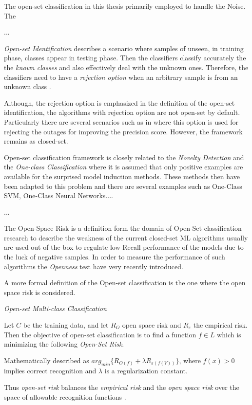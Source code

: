 The open-set classification in this thesis primarily employed to handle the Noise. The

...


\begin{definition}{\textit{Open-set Identification}}
describes a scenario where samples of unseen, in training phase, classes appear in testing phase. Then the classifiers classify accurately the the \textit{known classes} and also effectively deal with the unknown ones. Therefore, the classifiers need to have a \textit{rejection option} when an arbitrary sample is from an unknown class \parencite{geng2018recent}.
\end{definition}

Although, the rejection option is emphasized in the definition of the open-set identification, the algorithms with rejection option are not open-set by default. Particularly there are several scenarios such as in \parencite{onan2018ensemble} where this option is used for rejecting the outages for improving the precision score. However, the framework remains as closed-set.

Open-set classification framework is closely related to the \textit{Novelty Detection} and the \textit{One-class Classification} where it is assumed that only positive examples are available for the surprised model induction methods. These methods then have been adapted to this problem and there are several examples such as One-Class SVM, One-Class Neural Networks....


...


The {Open-Space Risk} is a definition form the domain of Open-Set classification research to describe the weakness of the current closed-set ML algorithms usually are used out-of-the-box to regulate low Recall performance of the models due to the luck of negative samples. In order to measure the performance of such algorithms the \textit{Openness} test have very recently introduced. 

A more formal definition of the Open-set classification is the one where the open space risk is considered.

\begin{definition}{\textit{Open-set Multi-class Classification}}

Let $C$ be the training data, and let $R_{O}$ open space risk and $R_{ε}$ the empirical risk. Then the objective of open-set classification is to find a function $f \in L$ which is minimizing the following \textit{Open-Set Risk}. 

Mathematically described as $arg_{min} \{R_{O(f )} + \lambda R_{ε (f (V ))}\}$, where $f (x) > 0$ implies correct recognition and $\lambda$ is a regularization constant.

Thus \textit{open-set risk} balances the \textit{empirical risk} and the \textit{open space risk} over the space of allowable recognition functions \parencite{geng2018recent}.

\end{definition}

